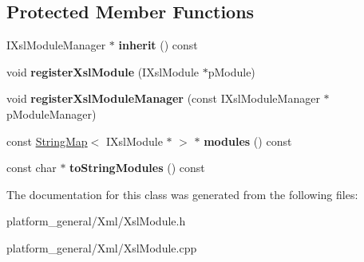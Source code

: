 \subsection*{\-Protected \-Member \-Functions}
\begin{DoxyCompactItemize}
\item 
\hypertarget{classgeneral__server_1_1XslModuleManager_aaee3bf397b5312f89fcfd5caa3e813ba}{\-I\-Xsl\-Module\-Manager $\ast$ {\bfseries inherit} () const }\label{classgeneral__server_1_1XslModuleManager_aaee3bf397b5312f89fcfd5caa3e813ba}

\item 
\hypertarget{classgeneral__server_1_1XslModuleManager_a39213516d5472c9bed180130a10a9c5a}{void {\bfseries register\-Xsl\-Module} (\-I\-Xsl\-Module $\ast$p\-Module)}\label{classgeneral__server_1_1XslModuleManager_a39213516d5472c9bed180130a10a9c5a}

\item 
\hypertarget{classgeneral__server_1_1XslModuleManager_a2ba7612c819ce36d19bca9dea9092c2c}{void {\bfseries register\-Xsl\-Module\-Manager} (const \-I\-Xsl\-Module\-Manager $\ast$p\-Module\-Manager)}\label{classgeneral__server_1_1XslModuleManager_a2ba7612c819ce36d19bca9dea9092c2c}

\item 
\hypertarget{classgeneral__server_1_1XslModuleManager_a7878ba34402d7edbc2a6081c9028bd88}{const \hyperlink{classgeneral__server_1_1StringMap}{\-String\-Map}$<$ \-I\-Xsl\-Module $\ast$ $>$ $\ast$ {\bfseries modules} () const }\label{classgeneral__server_1_1XslModuleManager_a7878ba34402d7edbc2a6081c9028bd88}

\item 
\hypertarget{classgeneral__server_1_1XslModuleManager_a832dc3fec2a6dfde31b92cf86b7f18b9}{const char $\ast$ {\bfseries to\-String\-Modules} () const }\label{classgeneral__server_1_1XslModuleManager_a832dc3fec2a6dfde31b92cf86b7f18b9}

\end{DoxyCompactItemize}


\-The documentation for this class was generated from the following files\-:\begin{DoxyCompactItemize}
\item 
platform\-\_\-general/\-Xml/\-Xsl\-Module.\-h\item 
platform\-\_\-general/\-Xml/\-Xsl\-Module.\-cpp\end{DoxyCompactItemize}
